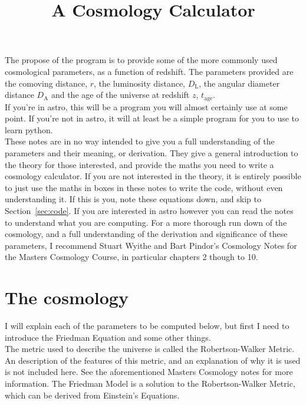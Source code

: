 \documentclass[]{article}
\begin{document}
\title{A Cosmology Calculator }
\maketitle

\noindent The propose of the program is to provide some of the more commonly used cosmological parameters, as a function of redshift. The parameters provided are the comoving distance, $r$, the luminosity distance, $D_\mathrm{L}$, the angular diameter distance $D_\mathrm{A}$ and the age of the universe at redshift $z$, $t_\mathrm{age}$. \\

\noindent If you're in astro, this will be a program you will almost certainly use at some point. If you're not in astro, it will at least be a simple program for you to use to learn python. \\

\noindent These notes are in no way intended to give you a full understanding of the parameters and their meaning, or derivation. They give a general introduction to the theory for those interested, and provide the maths you need to write a cosmology calculator. If you are not interested in the theory, it is entirely possible to just use the maths in boxes in these notes to write the code, without even understanding it. If this is you, note these equations down, and skip to Section~\ref{sec:code}. If you are interested in astro however you can read the notes to understand what you are computing. For a more thorough run down of the cosmology, and a full understanding of the derivation and significance of these parameters, I recommend Stuart Wyithe and Bart Pindor's Cosmology Notes for the Masters Cosmology Course, in particular chapters 2 though to 10. \\

\section{The cosmology}

\noindent I will explain each of the parameters to be computed below, but first I need to introduce the Friedman Equation and some other things.\\

\noindent The metric used to describe the universe is called the Robertson-Walker Metric. An description of the features of this metric, and an explanation of why it is used is not included here. See the aforementioned Masters Cosmology notes for more information. The Friedman Model is a solution to the Robertson-Walker Metric, which can be derived from Einstein’s Equations.\\
\end{document}
